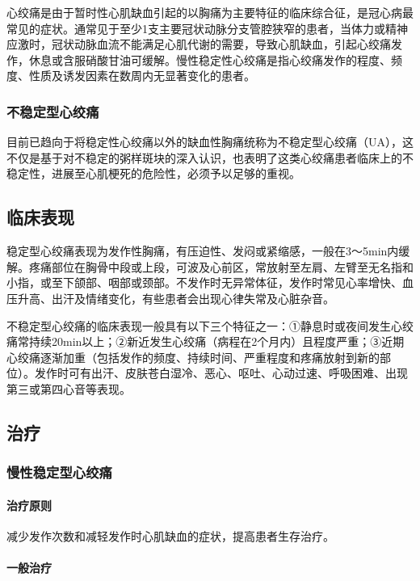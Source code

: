 心绞痛是由于暂时性心肌缺血引起的以胸痛为主要特征的临床综合征，是冠心病最常见的症状。通常见于至少1支主要冠状动脉分支管腔狭窄的患者，当体力或精神应激时，冠状动脉血流不能满足心肌代谢的需要，导致心肌缺血，引起心绞痛发作，休息或含服硝酸甘油可缓解。慢性稳定性心绞痛是指心绞痛发作的程度、频度、性质及诱发因素在数周内无显著变化的患者。

\subsubsection{不稳定型心绞痛}

目前已趋向于将稳定性心绞痛以外的缺血性胸痛统称为不稳定型心绞痛（UA），这不仅是基于对不稳定的粥样斑块的深入认识，也表明了这类心绞痛患者临床上的不稳定性，进展至心肌梗死的危险性，必须予以足够的重视。

\subsection{临床表现}

稳定型心绞痛表现为发作性胸痛，有压迫性、发闷或紧缩感，一般在3～5min内缓解。疼痛部位在胸骨中段或上段，可波及心前区，常放射至左肩、左臂至无名指和小指，或至下颌部、咽部或颈部。不发作时无异常体征，发作时常见心率增快、血压升高、出汗及情绪变化，有些患者会出现心律失常及心脏杂音。

不稳定型心绞痛的临床表现一般具有以下三个特征之一：①静息时或夜间发生心绞痛常持续20min以上；②新近发生心绞痛（病程在2个月内）且程度严重；③近期心绞痛逐渐加重（包括发作的频度、持续时间、严重程度和疼痛放射到新的部位）。发作时可有出汗、皮肤苍白湿冷、恶心、呕吐、心动过速、呼吸困难、出现第三或第四心音等表现。

\subsection{治疗}

\subsubsection{慢性稳定型心绞痛}
\paragraph{治疗原则}

减少发作次数和减轻发作时心肌缺血的症状，提高患者生存治疗。
\paragraph{一般治疗}

